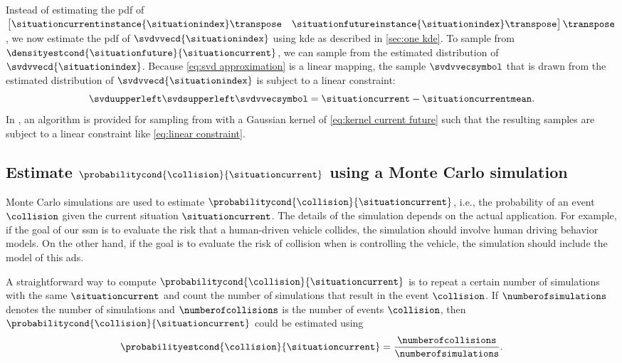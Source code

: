 Instead of estimating the \ac{pdf} of $\begin{bmatrix}\situationcurrentinstance{\situationindex}\transpose & \situationfutureinstance{\situationindex}\transpose\end{bmatrix}\transpose$, we now estimate the \ac{pdf} of $\svdvvecd{\situationindex}$ using \ac{kde} as described in \cref{sec:one kde}.
To sample from $\densityestcond{\situationfuture}{\situationcurrent}$, we can sample from the estimated distribution of $\svdvvecd{\situationindex}$.
Because \cref{eq:svd approximation} is a linear mapping, the sample $\svdvvecsymbol$ that is drawn from the estimated distribution of $\svdvvecd{\situationindex}$ is subject to a linear constraint:
\begin{equation}
	\label{eq:linear constraint}
	\svduupperleft \svdsupperleft \svdvvecsymbol = \situationcurrent - \situationcurrentmean.
\end{equation}
In \autocite{degelder2021conditional}, an algorithm is provided for sampling from  with a Gaussian kernel of \cref{eq:kernel current future} such that the resulting samples are subject to a linear constraint like \cref{eq:linear constraint}.



\subsection{Estimate $\probabilitycond{\collision}{\situationcurrent}$ using a Monte Carlo simulation}
\label{sec:estimate collision}

\cstarta Monte Carlo simulations are used to estimate $\probabilitycond{\collision}{\situationcurrent}$, i.e., the probability of an event $\collision$ given the current situation $\situationcurrent$. \cenda
The details of the simulation depends on the actual application. 
For example, if the goal of our \ac{ssm} is to evaluate the risk that a human-driven vehicle collides, the simulation should involve human driving behavior models. 
On the other hand, if the goal is to evaluate the risk of collision when  is controlling the vehicle, the simulation should include the model of this \ac{ads}.

A straightforward way to compute $\probabilitycond{\collision}{\situationcurrent}$ is to repeat a certain number of simulations with the same $\situationcurrent$ and count the number of simulations that result in the event $\collision$.
If $\numberofsimulations$ denotes the number of simulations and $\numberofcollisions$ is the number of events $\collision$, then $\probabilitycond{\collision}{\situationcurrent}$ could be estimated using
\begin{equation}
	\label{eq:binomial estimation}
	\probabilityestcond{\collision}{\situationcurrent}
	= \frac{\numberofcollisions}{\numberofsimulations}.
\end{equation}


